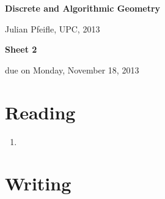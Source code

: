 \documentclass[11pt]{amsart}
\begin{document}
\begin{center}
\textbf{\sffamily
   Discrete and Algorithmic Geometry }

\medskip
   Julian Pfeifle,
   UPC, 2013 \mbox{}
\end{center}

\bigskip

\begin{center}
  \textbf{\sffamily Sheet 2}

\bigskip
 due on Monday, November 18, 2013

\end{center}

\bigskip
\bigskip
\bigskip

\section*{Reading}

\begin{enumerate}
\setlength{\itemsep}{2ex}

\item
\end{enumerate}

\bigskip
\bigskip
\section*{Writing}
\end{document}
